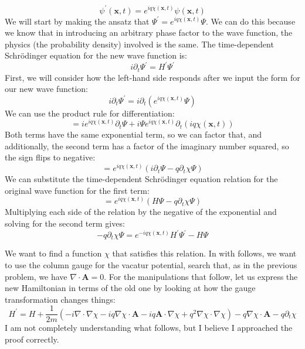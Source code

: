 \documentclass[12pt]{article}
\begin{document}
$$
\psi^{\prime}(\mathbf{x}, t)=e^{i q \chi(\mathbf{x}, t)} \psi(\mathbf{x}, t)
$$
We will start by making the ansatz that $\Psi^{\prime} = e^{i q \chi(\mathbf{x}, t)} \Psi$. We can do this because we know that in introducing an arbitrary phase factor to the wave function, the physics (the probability density) involved is the same.
The time-dependent Schrödinger equation for the new wave function is:
\begin{equation}
  i \partial_t \Psi^{\prime} = H^{\prime} \Psi^{\prime}
\end{equation}
First, we will consider how the left-hand side responds after we input the form for our new wave function:
\begin{equation}
  i \partial_t \Psi^{\prime} = i \partial_t \left( e^{i q \chi(\mathbf{x}, t)} \Psi \right)
\end{equation}
We can use the product rule for differentiation:
\begin{equation}
  = i e^{i q \chi(\mathbf{x}, t)} \partial_t \Psi + i \Psi e^{i q \chi(\mathbf{x}, t)} \partial_t \left( i q \chi(\mathbf{x}, t) \right)
\end{equation}
Both terms have the same exponential term, so we can factor that, and additionally, the second term has a factor of the imaginary number squared, so the sign flips to negative:
\begin{equation}
  = e^{i q \chi(\mathbf{x}, t)} \left( i \partial_t \Psi - q \partial_t \chi \Psi \right)
\end{equation}
We can substitute the time-dependent Schrödinger equation relation for the original wave function for the first term:
\begin{equation}
  = e^{i q \chi(\mathbf{x}, t)} (H \Psi - q \partial_t \chi \Psi)
\end{equation}
Multiplying each side of the relation by the negative of the exponential and solving for the second term gives:
\begin{equation}
  -q \partial_t \chi \Psi = e^{-i q \chi(\mathbf{x}, t)} H^{\prime} \Psi^{\prime} - H \Psi
\end{equation}

We want to find a function $\chi$ that satisfies this relation. In with follows, we want to use the column gauge for the vacatur potential, search that, as in the previous problem, we have $\nabla \cdot \mathbf{A} = 0$. For the manipulations that follow, let us express the new Hamiltonian in terms of the old one by looking at how the gauge transformation changes things:
\begin{equation}
  H^{\prime} = H + \frac{1}{2m} \left( -i \nabla \cdot \nabla \chi - i q \nabla \chi \cdot \mathbf{A} - i q \mathbf{A} \cdot \nabla \chi + q^2 \nabla \chi \cdot \nabla \chi \right) - q \nabla \chi \cdot \mathbf{A} - q \partial_t \chi
\end{equation}
I am not completely understanding what follows, but I believe I approached the proof correctly.
\end{document}
